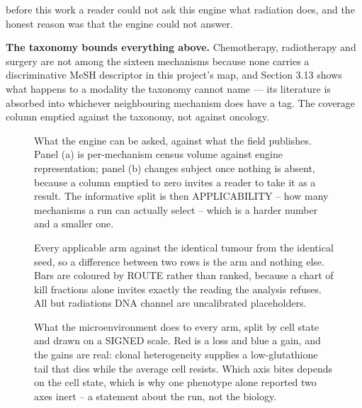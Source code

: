 \documentclass[11pt,twoside,openright]{report}
\begin{document}
before this work a reader could not ask this engine what radiation does, and the honest reason was that the engine could not answer.

\textbf{The taxonomy bounds everything above.} Chemotherapy, radiotherapy and surgery are not among the sixteen mechanisms because none carries a discriminative MeSH descriptor in this project's map, and Section 3.13 shows what happens to a modality the taxonomy cannot name --- its literature is absorbed into whichever neighbouring mechanism does have a tag. The coverage column emptied against the taxonomy, not against oncology.

\begin{figure}[tbp]
\setcounter{figure}{24}
\caption{What the engine can be asked, against what the field publishes. Panel (a) is per-mechanism census volume against engine representation; panel (b) changes subject once nothing is absent, because a column emptied to zero invites a reader to take it as a result. The informative split is then APPLICABILITY -- how many mechanisms a run can actually select -- which is a harder number and a smaller one.}
\label{fig:fig30_modality_landscape}
\end{figure}

\begin{figure}[tbp]
\setcounter{figure}{25}
\caption{Every applicable arm against the identical tumour from the identical seed, so a difference between two rows is the arm and nothing else. Bars are coloured by ROUTE rather than ranked, because a chart of kill fractions alone invites exactly the reading the analysis refuses. All but radiation\textquotesingle s DNA channel are uncalibrated placeholders.}
\label{fig:fig31_modality_panel}
\end{figure}

\begin{figure}[tbp]
\setcounter{figure}{26}
\caption{What the microenvironment does to every arm, split by cell state and drawn on a SIGNED scale. Red is a loss and blue a gain, and the gains are real: clonal heterogeneity supplies a low-glutathione tail that dies while the average cell resists. Which axis bites depends on the cell state, which is why one phenotype alone reported two axes inert -- a statement about the run, not the biology.}
\label{fig:fig32_modality_tme}
\end{figure}
\end{document}
